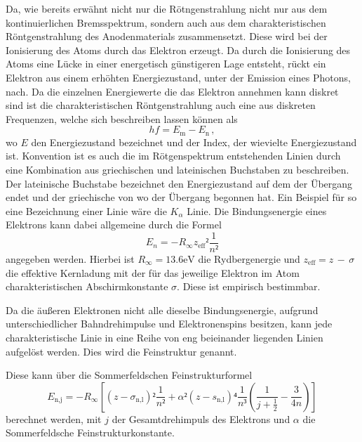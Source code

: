 \noindent
Da, wie bereits erwähnt nicht nur die Rötngenstrahlung nicht nur aus dem kontinuierlichen Bremsspektrum, sondern auch aus dem charakteristischen Röntgenstrahlung des Anodenmaterials 
zusammensetzt. Diese wird bei der Ionisierung des Atoms durch das Elektron erzeugt. Da durch die Ionisierung des Atoms eine Lücke in einer energetisch günstigeren Lage entsteht, rückt ein
Elektron aus einem erhöhten Energiezustand, unter der Emission eines Photons, nach. Da die einzelnen Energiewerte die das Elektron annehmen kann diskret sind ist die charakteristischen Röntgenstrahlung
auch eine aus diskreten Frequenzen, welche sich beschreiben lassen können als 
\begin{equation}
    h f = E_\text{m} - E_\text{n} \, ,
\end{equation}
wo $E$ den Energiezustand bezeichnet und der Index, der wievielte Energiezustand ist.  Konvention ist es auch die im Rötgenspektrum entstehenden Linien durch eine Kombination aus griechischen
und lateinischen Buchstaben zu beschreiben. Der lateinische Buchstabe bezeichnet den Energiezustand auf dem der Übergang endet und der griechische von wo der Übergang begonnen hat. Ein Beispiel
für so eine Bezeichnung einer Linie wäre die $K_\alpha$ Linie.
Die Bindungsenergie eines Elektrons kann dabei allgemeine durch die Formel 
\begin{equation}
    E_n = -R_{\infty} z_\text{eff}² \frac{1}{n²}
    \label{eqn:std}
\end{equation}
\noindent
angegeben werden. Hierbei ist $R_\infty = 13.6 \si{\eV}$ die Rydbergenergie und $z_\text{eff} = z \, - \, \sigma$ die effektive Kernladung mit der für das jeweilige Elektron im Atom charakteristischen 
Abschirmkonstante $\sigma$. Diese ist empirisch bestimmbar.

\noindent
Da die äußeren Elektronen nicht alle dieselbe Bindungsenergie, aufgrund unterschiedlicher Bahndrehimpulse und Elektronenspins besitzen, kann jede charakteristische Linie in eine Reihe
von eng beieinander liegenden Linien aufgelöst werden. Dies wird die Feinstruktur genannt. 

\noindent
Diese kann über die Sommerfeldschen Feinstrukturformel 
\begin{equation}
    E_{\text{n}, \text{j}} = -R_{\infty} \left[(z-\sigma_{\text{n}, \text{l}})²\frac{1}{n²}+\alpha²(z-s_{\text{n}, \text{l}})⁴\frac{1}{n³}\left(\frac{1}{j+\frac{1}{2}}-\frac{3}{4n}\right)\right]
   \end{equation}
berechnet werden, mit $j$ der Gesamtdrehimpuls des Elektrons und $\alpha$ die Sommerfeldsche Feinstrukturkonstante.

